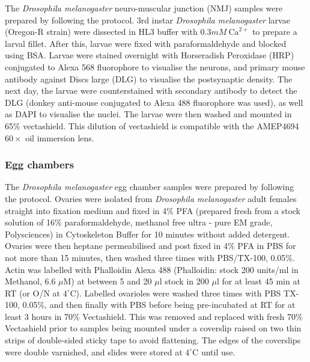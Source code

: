 The \textit{Drosophila melanogaster} neuro-muscular junction (NMJ) 
samples were prepared by following the protocol. 
3rd instar \textit{Drosophila melanogaster} larvae (Oregon-R 
strain) were dissected in HL3 buffer with $0.3mM~\text{Ca}^{2+}$ to 
prepare a larval fillet. After this, larvae were fixed with 
paraformaldehyde and blocked using BSA. Larvae were stained 
overnight with Horseradish Peroxidase (HRP) conjugated to Alexa 568 
fluorophore to visualise the neurons, and primary mouse antibody 
against Discs large (DLG) to visualise the postsynaptic density. 
The next day, the larvae were counterstained with secondary 
antibody to detect the DLG (donkey anti-mouse conjugated to 
Alexa 488 fluorophore was used), as well as DAPI to visualise the 
nuclei. The larvae were then washed and mounted in 65\% 
vectashield.\cite{brent2009drosophila} This dilution of 
vectashield is compatible with the AMEP4694 $60\times$ oil 
immersion lens.

\subsubsection{Egg chambers}
\label{subsubsec:Aurox_Egg_chambers_prep}

The \textit{Drosophila melanogaster} egg chamber samples were 
prepared by following the protocol. Ovaries were isolated from 
\textit{Drosophila melanogaster} adult females straight into fixation 
medium and fixed in 4\% PFA (prepared fresh from a stock solution 
of 16\% paraformaldehyde, methanol free ultra - pure EM grade, 
Polysciences) in Cytoskeleton Buffer for 10 minutes without added 
detergent.\cite{jia2016automatic,zhang2020nanoscale,leyton2016pfa} 
Ovaries were then heptane permeabilised and post fixed in 4\% PFA 
in PBS for not more than 15 minutes, then washed three times with 
PBS/TX-100, 0.05\%. Actin was labelled with Phalloidin Alexa 488 
(Phalloidin: stock 200 units/ml in Methanol, 6.6 $\mu$M) at between 
5 and 20 $\mu$l stock in 200 $\mu$l for at least 45 min at RT (or 
O/N at $4^{\circ}$C). Labelled ovarioles were washed three times with 
PBS TX-100, 0.05\%, and then finally with PBS before being 
pre-incubated at RT for at least 3 hours in 70\% Vectashield. This 
was removed and replaced with fresh 70\% Vectashield prior to samples 
being mounted under a coverslip raised on two thin strips of 
double-sided sticky tape to avoid flattening.\cite{davidson2016localized} 
The edges of the coverslips were double varnished, and slides were stored 
at $4^{\circ}$C until use.

